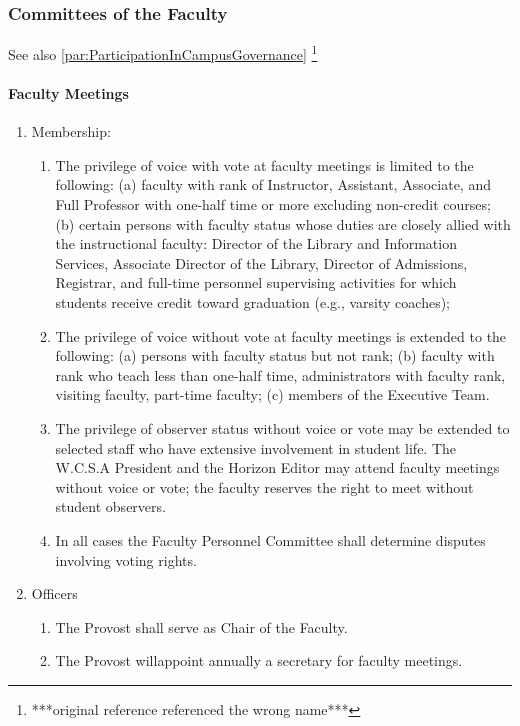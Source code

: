 \documentclass[letterpaper, 11pt]{article}
\newcommand{\fix}[1]{\footnote{***#1***}}
\begin{document}
		\subsubsection{Committees of the Faculty}
			See also
			\autoref{par:ParticipationInCampusGovernance}
			\fix{original reference referenced the wrong name}
			\paragraph{Faculty Meetings}
				\begin{enumerate}[label=\alph*)]
					\item{Membership:
						\begin{enumerate}[label=\arabic*)]
							\item{The privilege of voice with vote at faculty meetings is limited to the following:
								(a) faculty with rank of Instructor, Assistant, Associate, and Full Professor with one-half time or more excluding non-credit courses;
								(b) certain persons with faculty status whose duties are closely allied with the instructional faculty:  Director of the Library and Information Services, Associate Director of the Library, Director of Admissions, Registrar, and full-time personnel supervising activities for which students receive credit toward graduation (e.g., varsity coaches);}
							\item{The privilege of voice without vote at faculty meetings is extended to the following:
								(a) persons with faculty status but not rank;
								(b) faculty with rank who teach less than one-half time, administrators with faculty rank, visiting faculty, part-time faculty;
								(c) members of the Executive Team.}
							\item{The privilege of observer status without voice or vote may be extended to selected staff who have extensive involvement in student life.  The W.C.S.A President and the Horizon Editor may attend faculty meetings without voice or vote; the faculty reserves the right to meet without student observers.}
							\item{In all cases the Faculty Personnel Committee shall determine disputes involving voting rights.}
						\end{enumerate}
					}
					\item{Officers
						\begin{enumerate}[label=\arabic*)]
							\item{The Provost shall serve as Chair of the Faculty.}
							\item{The Provost willappoint annually a secretary for faculty meetings.}


\end{enumerate}}
\end{enumerate}
\end{document}

